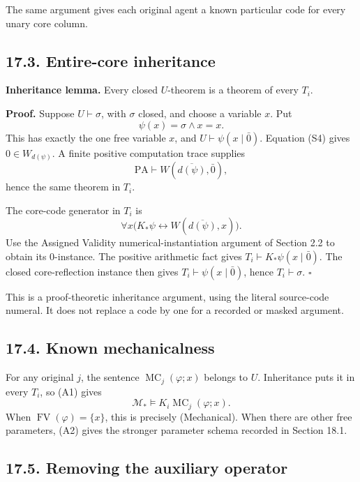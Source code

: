 \documentclass[
  11pt,
  letterpaper,
]{article}
\begin{document}
The same argument gives each original agent a known particular code for
every unary core column.

\subsection{17.3. Entire-core
inheritance}\label{entire-core-inheritance}

\textbf{Inheritance lemma.} Every closed \(U\)-theorem is a theorem of
every \(T_i\).

\textbf{Proof.} Suppose \(U\vdash\sigma\), with \(\sigma\) closed, and
choose a variable \(x\). Put \[
\psi(x)=\sigma\land x=x.
\] This has exactly the one free variable \(x\), and
\(U\vdash\psi(x\mid\bar0)\). Equation (S4) gives \(0\in W_{d(\psi)}\). A
finite positive computation trace supplies \[
\mathrm{PA}\vdash W(\overline{d(\psi)},\bar0),
\] hence the same theorem in \(T_i\).

The core-code generator in \(T_i\) is \[
\forall x\bigl(K_*\psi\leftrightarrow
                   W(\overline{d(\psi)},x)\bigr).
\] Use the Assigned Validity numerical-instantiation argument of Section
2.2 to obtain its \(0\)-instance. The positive arithmetic fact gives
\(T_i\vdash K_*\psi(x\mid\bar0)\). The closed core-reflection instance
then gives \(T_i\vdash\psi(x\mid\bar0)\), hence \(T_i\vdash\sigma\).
\(\square\)

This is a proof-theoretic inheritance argument, using the literal
source-code numeral. It does not replace a code by one for a recorded or
masked argument.

\subsection{17.4. Known mechanicalness}\label{known-mechanicalness}

For any original \(j\), the sentence \(\operatorname{MC}_j(\varphi;x)\)
belongs to \(U\). Inheritance puts it in every \(T_i\), so (A1) gives \[
\mathcal M_*\models K_i\operatorname{MC}_j(\varphi;x).
\tag{A2}
\] When \(\operatorname{FV}(\varphi)=\{x\}\), this is precisely
(Mechanical). When there are other free parameters, (A2) gives the
stronger parameter schema recorded in Section 18.1.

\subsection{17.5. Removing the auxiliary
operator}\label{removing-the-auxiliary-operator}
\end{document}
